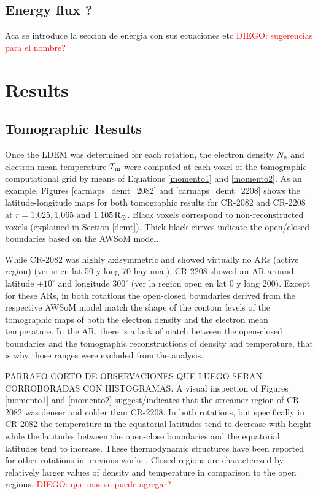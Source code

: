 \documentclass[namedreferences]{solarphysics}
\newcommand{\mdeg}{^\circ}
\newcommand{\mrsun}{{\rm R_\odot}}
\newcommand{\Tm}{T_{\rm m}}
\newcommand{\Ne}{N_{\rm e}}
\def\diego#1{\textcolor{red}{DIEGO: #1}}
\def\temp#1{\textcolor{mygray}{#1}}
\begin{document}
\begin{article}
\subsection{Energy flux ?}\label{energia} 
\temp{Aca se introduce la seccion de energia con sus ecuaciones etc}
\diego{sugerencias para el nombre?}




\section{Results}\label{resu} 



\subsection{Tomographic Results}\label{demt_res} 

Once the LDEM was determined for each rotation, the electron density $\Ne$ and electron mean temperature $\Tm$ were computed at each voxel of the tomographic computational grid by means of Equations \ref{momento1} and \ref{momento2}. As an example, Figures \ref{carmaps_demt_2082} and \ref{carmaps_demt_2208} shows the latitude-longitude maps for both tomographic results for CR-2082 and CR-2208 at $r=1.025, 1.065$ and $1.105\,\mrsun$. Black voxels correspond to non-reconstructed voxels (explained in Section \ref{demt}). Thick-black curves indicate the open/closed boundaries based on the AWSoM model.


While CR-2082 was highly axisymmetric and showed virtually no ARs (active region) \temp{(ver si en lat 50 y long 70 hay una.)}, CR-2208 showed an AR around latitude $+10\mdeg$ and longitude $300\mdeg$ \temp{(ver la region open en lat 0 y long 200)}. Except for these ARs, in both rotations the open-closed boundaries derived from the respective AWSoM model match the shape of the contour levels of the tomographic maps of both the electron density and the electron mean temperature. In the AR, there is a lack of match between the open-closed boundaries and the tomographic reconstructions of density and temperature, that is why those ranges were excluded from the analysis. 

\temp{PARRAFO CORTO DE OBSERVACIONES QUE LUEGO SERAN CORROBORADAS CON HISTOGRAMAS.}
A visual inspection of Figures \ref{momento1} and \ref{momento2} suggest/indicates that the streamer region of CR-2082 was denser and colder than CR-2208. In both rotations, but specifically in CR-2082 the temperature in the equatorial latitudes tend to decrease with height while the latitudes between the open-close boundaries and the equatorial latitudes tend to increase. These thermodynamic structures have been reported for other rotations in previous works \citep{lloveras_2017}. Closed regions are characterized by relatively larger values of density and temperature in comparison to the open regions.
\diego{que mas se puede agregar?}



\end{article}
\end{document}
